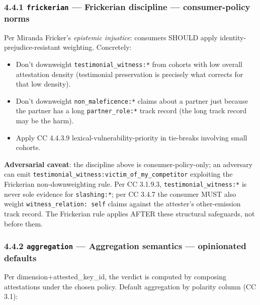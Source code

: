 \documentclass[11pt]{article}
\begin{document}
\subsubsection*{4.4.1 \texttt{frickerian} — Frickerian discipline — consumer-policy norms}


Per Miranda Fricker's \textit{epistemic injustice}: consumers SHOULD apply identity-prejudice-resistant weighting. Concretely:


\begin{itemize}\setlength\itemsep{0pt}
\item Don't downweight \texttt{testimonial\_witness:*} from cohorts with low overall attestation density (testimonial preservation is precisely what corrects for that low density).
\item Don't downweight \texttt{non\_maleficence:*} claims about a partner just because the partner has a long \texttt{partner\_role:*} track record (the long track record may be the harm).
\item Apply CC 4.4.3.9 lexical-vulnerability-priority in tie-breaks involving small cohorts.
\end{itemize}


\textbf{Adversarial caveat}: the discipline above is consumer-policy-only; an adversary can emit \texttt{testimonial\_witness:victim\_of\_my\_competitor} exploiting the Frickerian non-downweighting rule. Per CC 3.1.9.3, \texttt{testimonial\_witness:*} is never sole evidence for \texttt{slashing:*}; per CC 3.4.7 the consumer MUST also weight \texttt{witness\_relation: self} claims against the attester's other-emission track record. The Frickerian rule applies AFTER these structural safeguards, not before them.


\subsubsection*{4.4.2 \texttt{aggregation} — Aggregation semantics — opinionated defaults}


Per dimension+attested\_key\_id, the verdict is computed by composing attestations under the chosen policy. Default aggregation by polarity column (CC 3.1):
\end{document}
